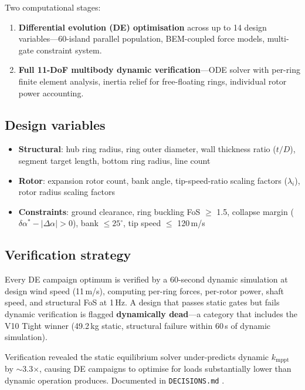 \documentclass[11pt,a4paper]{article}
\begin{document}
Two computational stages:

\begin{enumerate}
\item \textbf{Differential evolution (DE) optimisation} across up to 14 design variables---60-island
      parallel population, BEM-coupled force models, multi-gate constraint system.
\item \textbf{Full 11-DoF multibody dynamic verification}---ODE solver with per-ring finite element
      analysis, inertia relief for free-floating rings, individual rotor power accounting.
\end{enumerate}

\subsection{Design variables}

\begin{itemize}
\item \textbf{Structural}: hub ring radius, ring outer diameter, wall thickness ratio ($t/D$),
      segment target length, bottom ring radius, line count
\item \textbf{Rotor}: expansion rotor count, bank angle, tip-speed-ratio scaling factors ($\lambda_i$),
      rotor radius scaling factors
\item \textbf{Constraints}: ground clearance, ring buckling FoS $\geq$ 1.5,
      collapse margin ($\delta\alpha^* - |\Delta\alpha| > 0$), bank $\leq 25^\circ$,
      tip speed $\leq$ 120\,m/s
\end{itemize}

\subsection{Verification strategy}

Every DE campaign optimum is verified by a 60-second dynamic simulation at design wind speed
(11\,m/s), computing per-ring forces, per-rotor power, shaft speed, and structural FoS at 1\,Hz.
A design that passes static gates but fails dynamic verification is flagged
\textbf{dynamically dead}---a category that includes the V10 Tight winner
(49.2\,kg static, structural failure within 60\,s of dynamic simulation).

Verification revealed the static equilibrium solver under-predicts dynamic $k_{\text{mppt}}$
by $\sim$3.3$\times$, causing DE campaigns to optimise for loads substantially lower than
dynamic operation produces.
Documented in \texttt{DECISIONS.md} \cite{ktd_decisions2026}.
\end{document}
